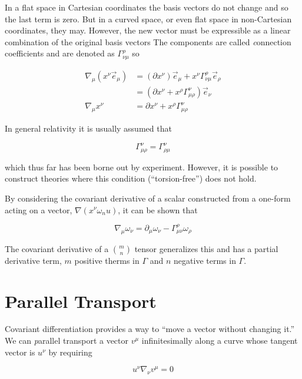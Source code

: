 In a flat space in Cartesian coordinates the basis vectors do not
change and so the last term is zero.  But in a curved space, or even
flat space in non-Cartesian coordinates, they may.  However, the new
vector must be expressible as a linear combination of the original
basis vectors  The components are called {\emph connection
coefficients} and are denoted as $\Gamma^\rho_{\nu\mu}$ so

\begin{align}
\label{eq:covariant_derivative}
\nabla_\mu (x^\nu \vec{e}_\mu) &= 
(\partial x^\nu) \vec{e}_\mu + 
x^\nu \Gamma^\rho_{\nu\mu} \vec{e}_\rho \\
&= (\partial x^\nu + x^\rho \Gamma^\nu_{\mu\rho}) \vec{e}_\nu \\
\nabla_\mu x^\nu &= \partial x^\nu + x^\rho \Gamma^\nu_{\mu\rho}
\end{align}

In general relativity it is usually assumed that

\begin{equation}
\label{eq:torsion}
 \Gamma^\nu_{\mu\rho} =  \Gamma^\nu_{\rho\mu}
\end{equation}

which thus far has been borne out by experiment.  However, it is
possible to construct theories where this condition (``torsion-free'')
does not hold.

By considering the covariant derivative of a scalar constructed from a
one-form acting on a vector, $\nabla (x^\nu \omega_nu)$, it can be shown
that

\begin{equation*}
\nabla_\mu \omega_\nu = \partial_\mu \omega_\nu - 
\Gamma^\rho_{\mu\nu} \omega_\rho
\end{equation*}

The covariant derivative of a ${m \choose n}$ tensor generalizes this
and has a partial derivative term, $m$ positive therms in $\Gamma$ and
$n$ negative terms in $\Gamma$.

\section{Parallel Transport}
\label{sec:parallel}

Covariant differentiation provides a way to ``move a vector without
changing it.''  We can {\emph parallel transport} a vector $v^\mu$
infinitesimally along a curve whose tangent vector is $u^\nu$ by
requiring

\begin{equation*}
u^\nu \nabla_\nu v^\mu = 0
\end{equation*}

